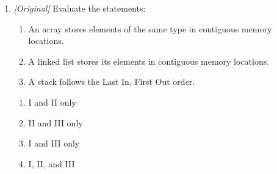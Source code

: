 \documentclass[11pt]{article}
\begin{document}
\begin{enumerate}[label=\textbf{Q\arabic*.}, leftmargin=*]
\begin{enumerate}[label=\Alph*.]
    \item It translates the whole program at once.
    \item It produces object code.
    \item It translates and executes the program line by line.
    \item It reports errors after translating the whole program.
  \end{enumerate}
\item \textit{[Original]} Evaluate the statements:
  \begin{enumerate}[label=\Roman*.]
    \item An array stores elements of the same type in contiguous memory
      locations.
    \item A linked list stores its elements in contiguous memory locations.
    \item A stack follows the Last In, First Out order.
  \end{enumerate}
  \begin{enumerate}[label=\Alph*.]
    \item I and II only
    \item II and III only
    \item I and III only
    \item I, II, and III
  \end{enumerate}


\end{enumerate}
\end{document}
